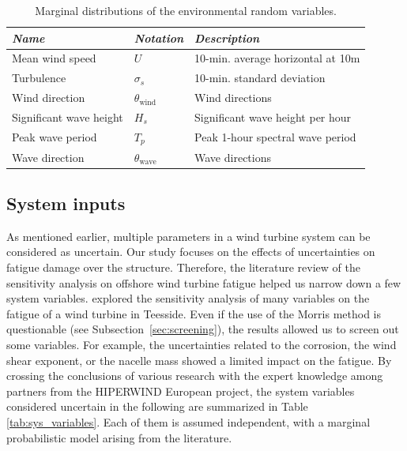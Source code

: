 \begin{table}[h!]
    \centering
    \begin{tabular}{ l l l}
        \hline
        {\it Name} & {\it Notation} & {\it Description}\\
        \hline
        Mean wind speed & $U$ & 10-min. average horizontal at 10m\\
        Turbulence & $\sigma_s $ & 10-min.  standard deviation \\
        Wind direction & $\theta_{\mathrm{wind}} $ & Wind directions\\
        Significant wave height & $H_s $  & Significant wave height per hour\\
        Peak wave period & $T_p $ & Peak 1-hour spectral wave period \\
        Wave direction & $\theta_{\mathrm{wave}} $ & Wave directions\\
        \hline
    \end{tabular}
    \caption{Marginal distributions of the environmental random variables.}
    \label{tab:envi_variables}
\end{table}

\subsection{System inputs}
As mentioned earlier, multiple parameters in a wind turbine system can be considered as uncertain. 
Our study focuses on the effects of uncertainties on fatigue damage over the structure. 
Therefore, the literature review of the sensitivity analysis on offshore wind turbine fatigue helped us narrow down a few system variables. 
\citet{petrovska_2022} explored the sensitivity analysis of many variables on the fatigue of a wind turbine in Teesside. 
Even if the use of the Morris method is questionable (see Subsection~\ref{sec:screening}), the results allowed us to screen out some variables. 
For example, the uncertainties related to the corrosion, the wind shear exponent, or the nacelle mass showed a limited impact on the fatigue.     
By crossing the conclusions of various research with the expert knowledge among partners from the HIPERWIND European project, the system variables considered uncertain in the following are summarized in Table \ref{tab:sys_variables}. 
Each of them is assumed independent, with a marginal probabilistic model arising from the literature. 



